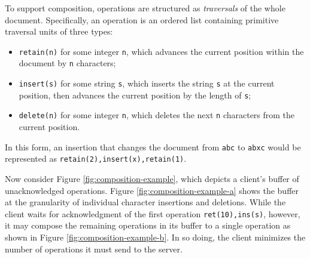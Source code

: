 \documentclass[letterpaper,11pt,twocolumn]{article}
\newcommand{\code}[1]{\texttt{\small #1}}
\begin{document}
To support composition, operations are structured as \emph{traversals} of the whole document.  Specifically, an operation is an ordered list containing primitive traversal units of three types:
\begin{itemize}
\item \code{retain(n)} for some integer \code{n}, which advances the current position within the document by \code{n} characters;
\item \code{insert(s)} for some string \code{s}, which inserts the string \code{s} at the current position, then advances the current position by the length of \code{s};
\item \code{delete(n)} for some integer \code{n}, which deletes the next \code{n} characters from the current position.
\end{itemize}
In this form, an insertion that changes the document from \code{abc} to \code{abxc} would be represented as \code{retain(2),insert(x),retain(1)}.  

Now consider Figure \ref{fig:composition-example}, which depicts a client's buffer of unacknowledged operations.  Figure \ref{fig:composition-example-a} shows the buffer at the granularity of individual character insertions and deletions.  While the client waits for acknowledgment of the first operation \code{ret(10),ins(s)}, however, it may compose the remaining operations in its buffer to a single operation as shown in Figure \ref{fig:composition-example-b}.  In so doing, the client minimizes the number of operations it must send to the server.
\end{document}
